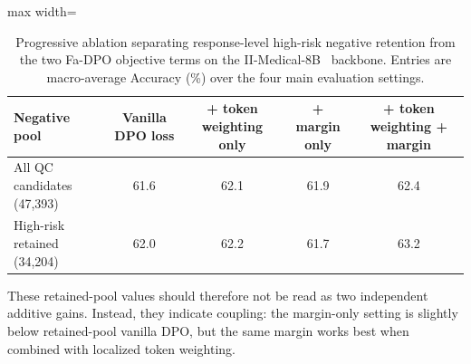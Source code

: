 \documentclass[a4paper,fleqn,doubleblind]{cas-sc}
\begin{document}
\begin{table}[htbp]
    \centering
    \renewcommand{\arraystretch}{1.1}
    \footnotesize
    \caption[Progressive ablation of negative filtering and objective modules.]{Progressive ablation separating response-level high-risk negative retention from the two Fa-DPO objective terms on the II-Medical-8B~\cite{intelligentinternet2025iimedical8b} backbone. Entries are macro-average Accuracy (\%) over the four main evaluation settings.}
    \label{tab:ablation_objective_matrix}
    \begin{adjustbox}{max width=\textwidth}
        \begin{tabular}{lcccc}
            \toprule
            \textbf{Negative pool} & \textbf{Vanilla DPO loss} & \textbf{+ token weighting only} & \textbf{+ margin only} & \textbf{+ token weighting + margin} \\
            \midrule
            All QC candidates (47,393) & 61.6 & 62.1 & 61.9 & 62.4 \\
            High-risk retained (34,204) & 62.0 & 62.2 & 61.7 & 63.2 \\
            \bottomrule
        \end{tabular}
    \end{adjustbox}
\end{table}

These retained-pool values should therefore not be read as two independent additive gains. Instead, they indicate coupling: the margin-only setting is slightly below retained-pool vanilla DPO, but the same margin works best when combined with localized token weighting.
\end{document}
